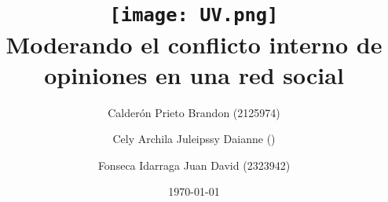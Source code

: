 \title{
	\texttt{[image: UV.png]} \\[1cm]
	Moderando el conflicto interno de opiniones en una red social
}
\author{
	Calderón Prieto Brandon (2125974) \and
	Cely Archila Juleipssy Daianne () \and
	Fonseca Idarraga Juan David (2323942) %
}
\date{\today}
